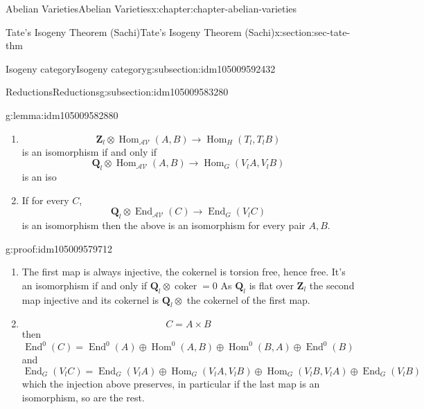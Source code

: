 \documentclass[oneside,10pt,]{book}
\numberwithin{equation}{section}
\newcommand{\ZZ}{\mathbf{Z}}
\newcommand{\QQ}{\mathbf{Q}}
\newcommand{\cat}[1]{\mathcal{#1}}
\DeclareMathOperator{\coker}{coker}
\DeclareMathOperator{\End}{End}
\DeclareMathOperator{\Hom}{Hom}
\begin{document}
\begin{chapterptx}{Abelian Varieties}{}{Abelian Varieties}{}{}{x:chapter:chapter-abelian-varieties}
\begin{sectionptx}{Tate's Isogeny Theorem (Sachi)}{}{Tate's Isogeny Theorem (Sachi)}{}{}{x:section:sec-tate-thm}
\begin{subsectionptx}{Isogeny category}{}{Isogeny category}{}{}{g:subsection:idm105009592432}
\begin{enumerate}
\end{enumerate}
%
\end{subsectionptx}
%
%
\typeout{************************************************}
\typeout{************************************************}
%
\begin{subsectionptx}{Reductions}{}{Reductions}{}{}{g:subsection:idm105009583280}
\begin{lemma}{}{}{g:lemma:idm105009582880}%
%
\begin{enumerate}
\item{}%
\begin{equation*}
\ZZ_l \otimes \Hom_\cat{AV} (A,B) \to \Hom_H(T_l, T_lB)
\end{equation*}
is an isomorphism if and only if%
\begin{equation*}
\QQ_l \otimes \Hom_\cat{AV} (A,B) \to \Hom_G(V_l A, V_l B)
\end{equation*}
is an iso%
\item{}If for every \(C\),%
\begin{equation*}
\QQ_l \otimes \End_\cat{AV} (C) \to \End_G(V_l C)
\end{equation*}
is an isomorphism then the above is an isomorphism for every pair \(A,B\).%
\end{enumerate}
%
\end{lemma}
\begin{proofptx}{}{g:proof:idm105009579712}
%
\begin{enumerate}
\item{}The first map is always injective, the cokernel is torsion free, hence free. It's an isomorphism if and only if \(\QQ_l \otimes \coker = 0\) As \(\QQ_l\) is flat over \(\ZZ_l\) the second map injective and its cokernel is \(\QQ_l \otimes\) the cokernel of the first map.%
\item{}%
\begin{equation*}
C = A\times B
\end{equation*}
then%
\begin{equation*}
\End^0(C) = \End^0(A)\oplus \Hom^0(A,B) \oplus \Hom^0(B,A) \oplus \End^0(B)
\end{equation*}
and%
\begin{equation*}
\End_G(V_lC) = \End_G(V_lA)\oplus \Hom_G(V_lA,V_lB) \oplus \Hom_G(V_lB,V_lA) \oplus \End_G(V_lB)
\end{equation*}
which the injection above preserves, in  particular if the last map is an isomorphism, so are the rest.%
\end{enumerate}

\end{proofptx}
\end{subsectionptx}
\end{sectionptx}
\end{chapterptx}
\end{document}
